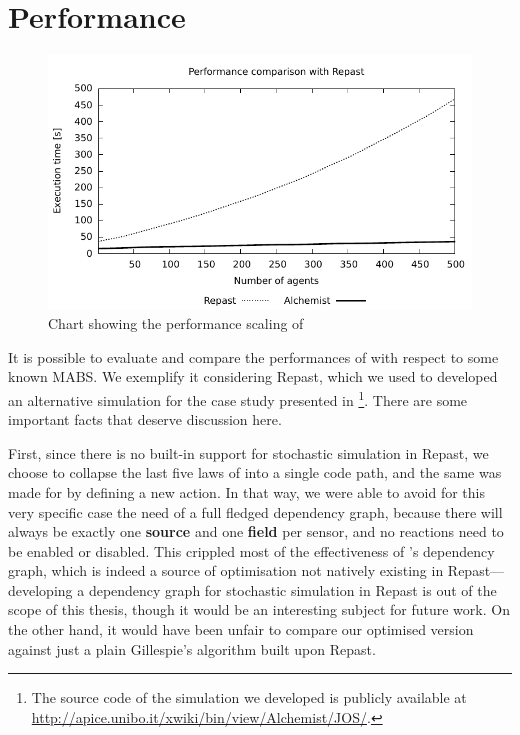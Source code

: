 \documentclass[12pt,a4paper,twoside,openright]{book}
\begin{document}
\chapter{Performance}
\begin{figure}[t]
    \includegraphics[width=0.999999\columnwidth]{img/jos-graph01}
    \caption{Chart showing the performance scaling of \alchemist{}}
    \label{img:repastperf}
\end{figure}

It is possible to evaluate and compare the performances of \alchemist{} with respect to some known MABS.
%
We exemplify it considering Repast, which we used to developed an alternative simulation for the case study presented in \footnote{The source code of the simulation we developed is publicly available at \mbox{\url{http://apice.unibo.it/xwiki/bin/view/Alchemist/JOS/}.}}. There are some important facts that deserve discussion here.

First, since there is no built-in support for stochastic simulation in Repast, we choose to collapse the last five laws of  into a single code path, and the same was made for \alchemist{} by defining a new action.
%
In that way, we were able to avoid for this very specific case the need of a full fledged dependency graph, because there will always be exactly one \textbf{source} and one \textbf{field} per sensor, and no reactions need to be enabled or disabled.
%
This crippled most of the effectiveness of \alchemist{}'s dependency graph, which is indeed a source of optimisation not natively existing in Repast---developing a dependency graph for stochastic simulation in Repast is out of the scope of this thesis, though it would be an interesting subject for future work.
%
On the other hand, it would have been unfair to compare our optimised version against just a plain Gillespie's algorithm built upon Repast.
\end{document}
